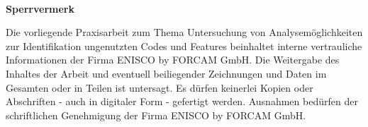 
~

\vspace{17.1mm}

\begin{flushleft}
    \textbf{\huge{}Sperrvermerk}{\huge\par}
\par\end{flushleft}
Die vorliegende Praxisarbeit zum Thema \glqq Untersuchung von Analysemöglichkeiten zur Identifikation ungenutzten Codes und Features\grqq{} beinhaltet interne vertrauliche Informationen der Firma ENISCO by FORCAM GmbH. Die Weitergabe des Inhaltes der Arbeit und eventuell beiliegender Zeichnungen und Daten im Gesamten oder in Teilen ist untersagt. Es dürfen keinerlei Kopien oder Abschriften - auch in digitaler Form - gefertigt werden. Ausnahmen bedürfen der schriftlichen Genehmigung der Firma ENISCO by FORCAM GmbH.